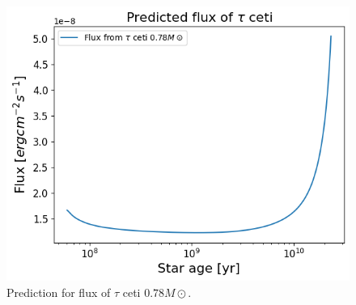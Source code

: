 \begin{figure}[H]
	\centering
	\includegraphics[width=\textwidth]{assets/fluxtau.png}
	\caption{Prediction for flux of $\tau$ ceti $0.78 M\odot$.}
	\label{fig:fluxtau}
\end{figure}

